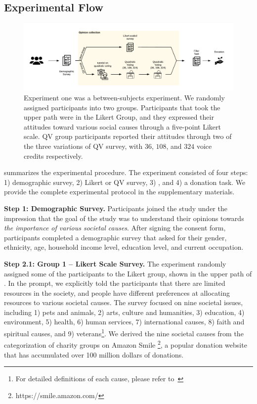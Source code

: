\subsection{Experimental Flow}
\begin{figure}[htpb]
    \centering
    \includegraphics[width=\textwidth, keepaspectratio=true]{content/image/exp1_flow.pdf}
    \caption{
        Experiment one was a between-subjects experiment. We randomly assigned participants into two groups. Participants that took the upper path were in the Likert Group, and they expressed their attitudes toward various social causes through a five-point Likert scale. QV group participants reported their attitudes through two of the three variations of QV survey, with $36$, $108$, and $324$ voice credits respectively.
    }
    \label{fig:exp1_image_flow}
\end{figure}

 summarizes the experimental procedure. The experiment consisted of four steps: 1) demographic survey, 2) Likert or QV survey, 3) {}, and 4) a donation task. We provide the complete experimental protocol in the supplementary materials.

\textbf{Step 1: Demographic Survey.} Participants joined the study under the impression that the goal of the study was to understand their opinions towards \textit{the importance of various societal causes}. After signing the consent form, participants completed a demographic survey that asked for their gender, ethnicity, age, household income level, education level, and current occupation.

\textbf{Step 2.1: Group 1 -- Likert Scale Survey.} The experiment randomly assigned some of the participants to the Likert group, shown in the upper path of . In the prompt, we explicitly told the participants that there are limited resources in the society, and people have different preferences at allocating resources to various societal causes. The survey focused on nine societal issues, including 1) pets and animals, 2) arts, culture and humanities, 3) education, 4) environment, 5) health, 6) human services, 7) international causes, 8) faith and spiritual causes, and 9) veterans\footnote{For detailed definitions of each cause, please refer to~}. We derived the nine societal causes from the categorization of charity groups on Amazon Smile \footnote{https://smile.amazon.com/}, a popular donation website that has accumulated over 100 million dollars of donations.

